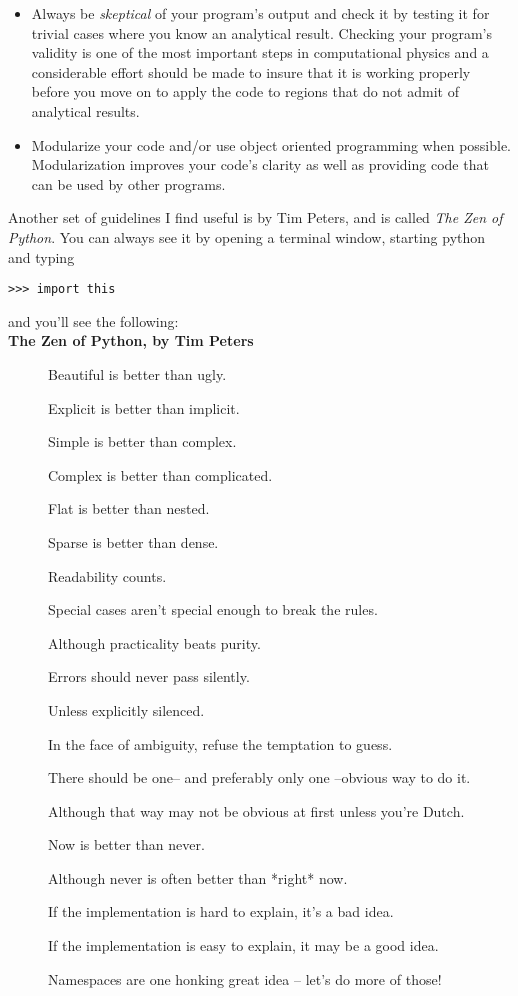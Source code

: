 \begin{itemize}
	\item Always be \textit{skeptical} of your program's output and check it by testing it for trivial cases where you know an analytical result. Checking your program's validity is one of the most important steps in computational physics and a considerable effort should be made to insure that it is working properly before you move on to apply the code to regions that do not admit of analytical results. 
	
	\item Modularize your code and/or use object oriented programming when possible. Modularization improves your code's clarity as well as providing code that can be used by other programs. 

\end{itemize}

Another set of guidelines I find useful is by Tim Peters, and is called \textit{The Zen of Python}. You can always see it by opening a terminal window, starting python and typing \\
\begin{verbatim}
>>> import this 
\end{verbatim}
and you'll see the following:\\[1cm]
\textbf{The Zen of Python, by Tim Peters
}
\begin{description}
\item[] Beautiful is better than ugly.
\item[] Explicit is better than implicit.
\item[] Simple is better than complex.
\item[] Complex is better than complicated.
\item[] Flat is better than nested.
\item[] Sparse is better than dense.
\item[] Readability counts.
\item[] Special cases aren't special enough to break the rules.
\item[] Although practicality beats purity.
\item[]  Errors should never pass silently.
\item[]  Unless explicitly silenced.
\item[]  In the face of ambiguity, refuse the temptation to guess.
\item[]  There should be one-- and preferably only one --obvious way to do it.
\item[]  Although that way may not be obvious at first unless you're Dutch.
\item[]  Now is better than never.
\item[]  Although never is often better than *right* now.
\item[]  If the implementation is hard to explain, it's a bad idea.
\item[]  If the implementation is easy to explain, it may be a good idea.
\item[]  Namespaces are one honking great idea -- let's do more of those!
\end{description}